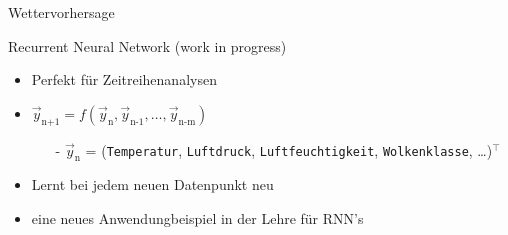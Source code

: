 \begin{frame}[c]{Wettervorhersage}
	\begin{block}{Recurrent Neural Network \tiny\alert{(work in progress)}}
				\begin{itemize}
					\item Perfekt f\"ur Zeitreihenanalysen
					\item $\vec{y}_\text{n+1} = f(\vec{y}_\text{n}, \vec{y}_\text{n-1},
						\ldots, \vec{y}_\text{n-m})$
						\begin{itemize}
							\item[-] $\vec{y}_\text{n}$ = (\texttt{Temperatur}, \texttt{Luftdruck},
						\texttt{Luftfeuchtigkeit}, \texttt{Wolkenklasse}, \ldots)$^\intercal$
						\end{itemize}
					\item Lernt bei jedem neuen Datenpunkt neu
					\item \alert{eine neues Anwendungbeispiel in der Lehre für
						RNN's}
				\end{itemize}
				\vspace{-0.7cm}
	\end{block}
\end{frame}
